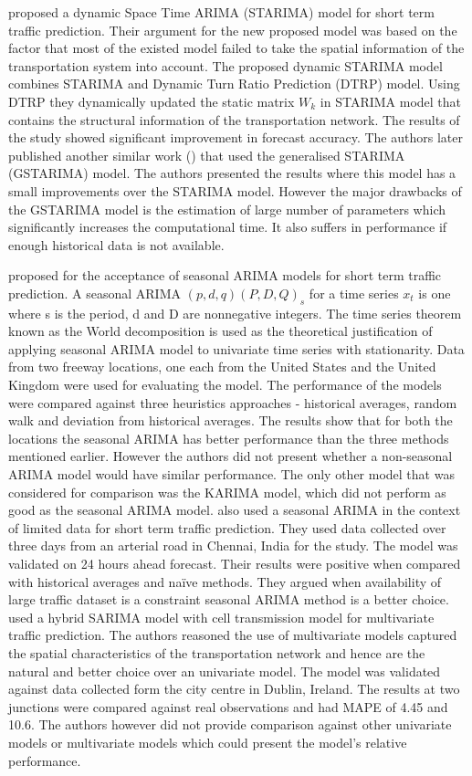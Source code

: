 \citet{min2009short} proposed a dynamic Space Time ARIMA (STARIMA) model for short term traffic
prediction. Their argument for the new proposed model was based on the factor that most of the
existed model failed to take the spatial information of the transportation system into account.
The proposed dynamic STARIMA model combines STARIMA and Dynamic Turn Ratio Prediction (DTRP)
model. Using DTRP they dynamically updated the static matrix $W_{k}$ in STARIMA model that contains
the structural information of the transportation network. The results of the study showed
significant improvement in forecast accuracy. The authors later published another similar work
(\citet{min2010urban}) that used the generalised STARIMA (GSTARIMA) model.  The authors
presented the results where this model has a small improvements over the STARIMA model. However
the major drawbacks of the GSTARIMA model is the estimation of large number of parameters which
significantly increases the computational time. It also suffers in performance if enough historical
data is not available.

\citet{williams2003modeling} proposed for the acceptance of seasonal ARIMA models for short term
traffic prediction. A seasonal ARIMA $(p,d,q) (P,D,Q)_{s}$ for a time series {$x_{t}$} is one
where s is the period, d and D are nonnegative integers. The time series theorem known as the World
decomposition is used as the theoretical justification of applying seasonal ARIMA model to
univariate time series with stationarity. Data from two freeway locations, one each from the
United States and the United Kingdom were used for evaluating the model. The performance of the
models were compared against three heuristics approaches - historical averages, random walk and
deviation from historical averages. The results show that for both the locations the seasonal
ARIMA has better performance than the three methods mentioned earlier. However the authors did
not present whether a non-seasonal ARIMA model would have similar performance. The only other
model that was considered for comparison was the KARIMA model, which did not perform as good as
the seasonal ARIMA model. \citet{kumar2015short} also used a seasonal ARIMA in the context of
limited data for short term traffic prediction. They used data collected over three days from an
arterial road in Chennai, India for the study. The model was validated on 24 hours ahead forecast.
Their results were positive when compared with historical averages and naïve methods. They
argued when availability of large traffic dataset is a constraint seasonal ARIMA method is a
better choice. \citet{szeto2009multivariate} used a hybrid SARIMA model with cell transmission
model for multivariate traffic prediction. The authors reasoned the use of multivariate models
captured the spatial characteristics of the transportation network and hence are the natural
and better choice over an univariate model. The model was validated against data collected form
the city centre in Dublin, Ireland. The results at two junctions were compared against real
observations and had MAPE of 4.45 and 10.6. The authors however did not provide comparison
against other univariate models or multivariate models which could present the model's relative
performance.

